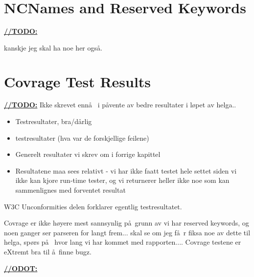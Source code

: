 \section{NCNames and Reserved Keywords}
\underline{\textbf{\LARGE //TODO:}}

kanskje jeg skal ha noe her ogs\aa .


\section{Covrage Test Results}
\label{sect:discussion:coverageResults}
\underline{\textbf{\LARGE //TODO:}} Ikke skrevet enn\aa~ i p\aa vente av bedre resultater i l\o pet av helga..
\begin{itemize}
\item Testresultater, bra/d\aa rlig
\item testresultater (hva var de forskjellige feilene)
\item Generelt resultater vi skrev om i forrige kapittel
\item Resultatene maa sees relativt - vi har ikke faatt testet hele settet siden
vi ikke kan kjore run-time tester, og vi returnerer heller ikke noe som kan
sammenlignes med forventet resultat
\end{itemize}

W3C Unconformities delen forklarer egentlig testresultatet.

Covrage er ikke h\o yere mest sannsynlig p\aa~grunn av vi har reserved keywords, og noen ganger ser parseren for langt frem... skal se om jeg f\aa~r fiksa noe av dette til helga, sp\o rs p\aa~ hvor lang vi har kommet med rapporten.... Covrage testene er eXtremt bra til \aa~finne bugz.

\underline{\textbf{\LARGE //ODOT:}}